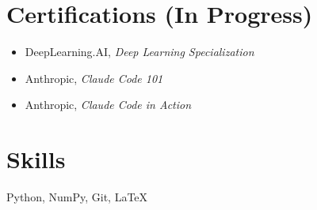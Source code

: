 \documentclass[10pt,letterpaper]{article}
\begin{document}
\section{Certifications (In Progress)}
\begin{itemize}
  \item DeepLearning.AI, \textit{Deep Learning Specialization}
  \item Anthropic, \textit{Claude Code 101}
  \item Anthropic, \textit{Claude Code in Action}
\end{itemize}

\section{Skills}
Python, NumPy, Git, \LaTeX
\end{document}
